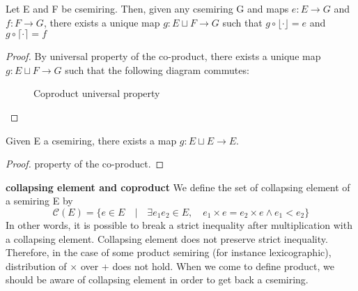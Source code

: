 
\begin{theorem}
	Let E and F be csemiring. Then, given any csemiring G and maps $e : E \rightarrow G $ and $f : F \rightarrow G $, there exists a unique map $g : E \sqcup F \rightarrow G $ such that $g \circ \lfloor \cdot \rfloor  = e$ and $g \circ \lceil \cdot \rceil = f$
\end{theorem}

\begin{proof}
	By universal property of the co-product, there exists a unique map $g:E\sqcup F \rightarrow G$ such that the following diagram commutes:
	\begin{figure}[H]
		\centering
		\resizebox{8cm}{!}{}
		\caption{Coproduct universal property}
		\label{coprod}
	\end{figure}
\end{proof}

\begin{lemma}
	Given E a csemiring, there exists a map $g : E \sqcup E \rightarrow E$.
\end{lemma}
\begin{proof}
	property of the co-product.
\end{proof}


\noindent
\textbf{collapsing element and coproduct} We define the set of collapsing element of a semiring E by $$\mathcal{C}(E) = \{e \in E \quad | \quad \exists e_1 e_2 \in E, \quad e_1 \times e = e_2 \times e \land e_1 < e_2  \}$$
In other words, it is possible to break a strict inequality after multiplication with a collapsing element. Collapsing element does not preserve strict inequality. Therefore, in the case of some product semiring (for instance lexicographic), distribution of $\times$ over + does not hold. When we come to define product, we should be aware of collapsing element in order to get back a csemiring. \\

